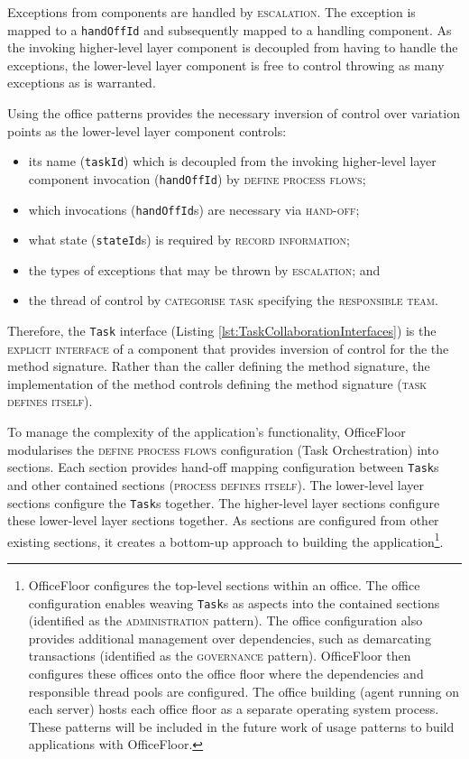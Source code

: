 \documentclass[prodmode]{style/acmlarge}
\begin{document}
Exceptions from components are handled by \textsc{escalation}.  The
exception is mapped to a \texttt{handOffId} and subsequently mapped to a
handling component.  As the invoking higher-level layer component is decoupled
from having to handle the exceptions, the lower-level layer component is free to
control throwing as many exceptions as is warranted.

Using the office patterns provides the necessary inversion of control over
variation points as the lower-level layer component controls:
\begin{itemize}
  \item its name (\texttt{taskId}) which is decoupled from the invoking higher-level layer component invocation (\texttt{handOffId}) by \textsc{define process flows};
  \item which invocations (\texttt{handOffId}s) are necessary via \textsc{hand-off};
  \item what state (\texttt{stateId}s) is required by \textsc{record information};
  \item the types of exceptions that may be thrown by \textsc{escalation}; and
  \item the thread of control by \textsc{categorise task} specifying the \textsc{responsible team}.
\end{itemize}

Therefore, the \texttt{Task} interface (Listing
\ref{lst:TaskCollaborationInterfaces}) is the \textsc{explicit interface} of a
component that provides inversion of control for the the method signature. 
Rather than the caller defining the method signature, the implementation of the
method controls defining the method signature (\textsc{task defines itself}).

To manage the complexity of the application's functionality, OfficeFloor
modularises the \textsc{define process flows} configuration (Task Orchestration)
into sections.  Each section provides hand-off mapping configuration between
\texttt{Task}s and other contained sections (\textsc{process defines itself}).
The lower-level layer sections configure the \texttt{Task}s together.  The
higher-level layer sections configure these lower-level layer sections together.
As sections are configured from other existing sections, it creates a bottom-up
approach to building the application\footnote{OfficeFloor configures the
top-level sections within an office.  The office configuration enables weaving
\texttt{Task}s as aspects into the contained sections (identified as the
\textsc{administration} pattern).  The office configuration also provides
additional management over dependencies, such as demarcating transactions
(identified as the \textsc{governance} pattern). OfficeFloor then configures
these offices onto the office floor where the dependencies and responsible
thread pools are configured.  The office building (agent running on each server)
hosts each office floor as a separate operating system process.  These patterns
will be included in the future work of usage patterns to build applications with
OfficeFloor.}.
\end{document}
